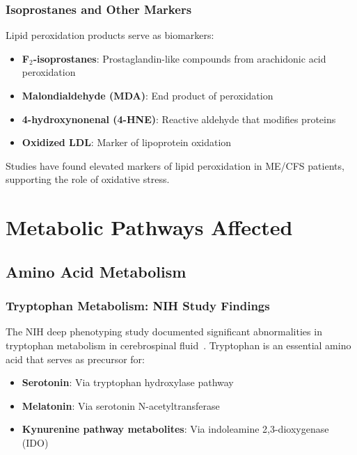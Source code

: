 \subsubsection{Isoprostanes and Other Markers}

Lipid peroxidation products serve as biomarkers:

\begin{itemize}
    \item \textbf{F$_2$-isoprostanes}: Prostaglandin-like compounds from arachidonic acid peroxidation
    \item \textbf{Malondialdehyde (MDA)}: End product of peroxidation
    \item \textbf{4-hydroxynonenal (4-HNE)}: Reactive aldehyde that modifies proteins
    \item \textbf{Oxidized LDL}: Marker of lipoprotein oxidation
\end{itemize}

Studies have found elevated markers of lipid peroxidation in ME/CFS patients, supporting the role of oxidative stress.

\section{Metabolic Pathways Affected}
\label{sec:metabolic-pathways}

\subsection{Amino Acid Metabolism}
\label{sec:amino-acid}

\subsubsection{Tryptophan Metabolism: NIH Study Findings}

The NIH deep phenotyping study documented significant abnormalities in tryptophan metabolism in cerebrospinal fluid~\cite{walitt2024deep}. Tryptophan is an essential amino acid that serves as precursor for:

\begin{itemize}
    \item \textbf{Serotonin}: Via tryptophan hydroxylase pathway
    \item \textbf{Melatonin}: Via serotonin N-acetyltransferase
    \item \textbf{Kynurenine pathway metabolites}: Via indoleamine 2,3-dioxygenase (IDO)
\end{itemize}

